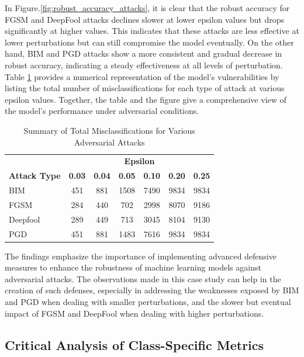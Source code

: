 \documentclass[10pt, conference, a4paper, final]{IEEEtran}
\begin{document}
In Figure.\ref {fig:robust_accuracy_attacks}, it is clear that the robust accuracy for FGSM and DeepFool attacks declines slower at lower epsilon values but drops significantly at higher values. This indicates that these attacks are less effective at lower perturbations but can still compromise the model eventually. On the other hand, BIM and PGD attacks show a more consistent and gradual decrease in robust accuracy, indicating a steady effectiveness at all levels of perturbation. Table \ref{tab:misclassifications} provides a numerical representation of the model's vulnerabilities by listing the total number of misclassifications for each type of attack at various epsilon values. Together, the table and the figure give a comprehensive view of the model's performance under adversarial conditions.
\begin{table}[ht]
    \centering
    \caption{Summary of Total Misclassifications for Various Adversarial Attacks}
    \label{tab:misclassifications}
    \begin{tabular}{|l|c|c|c|c|c|c|}
    \hline
    & \multicolumn{6}{c|}{\textbf{Epsilon}} \\ \cline{2-7} 
    \multirow{-2}{*}{\textbf{Attack Type}} & \textbf{0.03} & \textbf{0.04} & \textbf{0.05} & \textbf{0.10} & \textbf{0.20} & \textbf{0.25} \\ \hline
    BIM & 451 & 881 & 1508 & 7490 & 9834 & 9834 \\ \hline
    FGSM & 284 & 440 & 702 & 2998 & 8070 & 9186 \\ \hline
    Deepfool & 289 & 449 & 713 & 3045 & 8104 & 9130 \\ \hline
    PGD & 451 & 881 & 1483 & 7616 & 9834 & 9834 \\ \hline
    \end{tabular}
\end{table}

The findings emphasize the importance of implementing advanced defensive measures to enhance the robustness of machine learning models against adversarial attacks. The observations made in this case study can help in the creation of such defenses, especially in addressing the weaknesses exposed by BIM and PGD when dealing with smaller perturbations, and the slower but eventual impact of FGSM and DeepFool when dealing with higher perturbations.

\subsection{Critical Analysis of Class-Specific Metrics}
\end{document}
